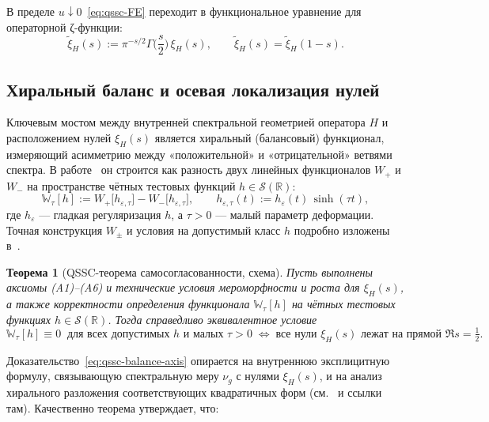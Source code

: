 \documentclass{article}
\numberwithin{equation}{section}
\theoremstyle{plain}
\newtheorem{theorem}{Теорема}
\theoremstyle{definition}
\theoremstyle{remark}
\begin{document}
В пределе $u\downarrow0$~\eqref{eq:qssc-FE} переходит в функциональное
уравнение для операторной ζ-функции:
\begin{equation}
\label{eq:qssc-xi-FE}
\widetilde{\xi}_H(s)
:=
\pi^{-s/2}\Gamma\!\Big(\frac s2\Big)\,\xi_H(s),
\qquad
\widetilde{\xi}_H(s)=\widetilde{\xi}_H(1-s).
\end{equation}

\subsection{Хиральный баланс и осевая локализация нулей}
\label{subsec:qssc-balance-axis}

\noindent
Ключевым мостом между внутренней спектральной геометрией оператора $H$ и
расположением нулей $\xi_H(s)$ является хиральный (балансовый) функционал,
измеряющий асимметрию между «положительной» и «отрицательной» ветвями
спектра. В работе~\cite{Monakhov-QSG-002} он строится как разность двух
линейных функционалов $W_+$ и $W_-$ на пространстве чётных тестовых функций
$h\in\mathcal S(\mathbb R)$:
\begin{equation}
\label{eq:qssc-W-tau-def}
\mathbb W_\tau[h]
:=
W_+\big[h_{\varepsilon,\tau}\big]
-
W_-\big[h_{\varepsilon,\tau}\big],
\qquad
h_{\varepsilon,\tau}(t)
:=
h_\varepsilon(t)\,\sinh(\tau t),
\end{equation}
где $h_\varepsilon$ — гладкая регуляризация $h$, а $\tau>0$ — малый
параметр деформации. Точная конструкция $W_\pm$ и условия на допустимый
класс $h$ подробно изложены в~\cite{Monakhov-QSG-002}.

\begin{theorem}[QSSC-теорема самосогласованности, схема]
\label{thm:qssc-main}
Пусть выполнены аксиомы \emph{(A1)–(A6)} и технические условия
мероморфности и роста для $\xi_H(s)$, а также корректности определения
функционала $\mathbb W_\tau[h]$ на чётных тестовых функциях
$h\in\mathcal S(\mathbb R)$. Тогда справедливо эквивалентное условие
\begin{equation}
\label{eq:qssc-balance-axis}
\mathbb W_\tau[h]\equiv 0
\;\;\text{для всех допустимых $h$ и малых $\tau>0$}\;
\Longleftrightarrow\;
\text{все нули $\xi_H(s)$ лежат на прямой $\Re s=\tfrac12$}.
\end{equation}
\end{theorem}

\noindent
Доказательство~\eqref{eq:qssc-balance-axis} опирается на внутреннюю
эксплицитную формулу, связывающую спектральную меру $\nu_g$ с нулями
$\xi_H(s)$, и на анализ хирального разложения соответствующих
квадратичных форм (см.~\cite{Monakhov-QSG-002} и ссылки там).
Качественно теорема утверждает, что:
\end{document}
